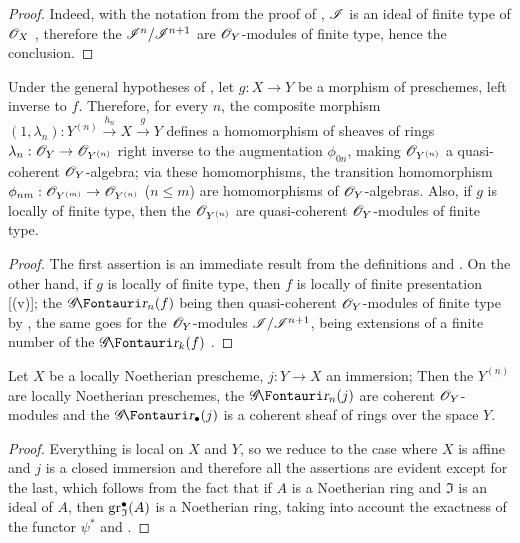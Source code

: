 \begin{proof}
Indeed, with the notation from the proof of , $\mathscr{I}$ is an ideal of finite type of $\mathscr{O}_X$ , therefore the $\mathscr{I}^n/\mathscr{I}^{n+1}$ are $\mathscr{O}_Y$-modules of finite type, hence the conclusion.
\end{proof}

\begin{corollary}[16.1.7]
\label{IV.16.1.7}
Under the general hypotheses of , let $g:X \to Y$ be a morphism of preschemes, left inverse to $f$.
Therefore, for every $n$, the composite morphism $(1, \lambda_n): Y^{(n)}\xrightarrow{h_n} X \xrightarrow{g} Y$ defines a homomorphism of sheaves of rings $\lambda_n: \sh{O}_Y \to \sh{O}_{Y^{(n)}}$ right inverse to the augmentation $\phi_{0n}$, making $\mathscr{O}_{Y^{(n)}}$ a quasi-coherent $\mathscr{O}_Y$-algebra;
via these homomorphisms, the transition homomorphism $\phi_{nm}:\sh{O}_{Y^{(m)}} \to \sh{O}_{Y^{(n)}}$ ($n\leq m$) are homomorphisms of $\mathscr{O}_Y$-algebras. 
Also, if $g$ is locally of finite type, then the $\mathscr{O}_{Y^{(n)}}$ are quasi-coherent $\mathscr{O}_Y$-modules of finite type.
\end{corollary}

\begin{proof}
The first assertion is an immediate result from the definitions and .
On the other hand, if $g$ is locally of finite type, then $f$ is locally of finite presentation [(v)];
the $\shGr_n(f)$ being then quasi-coherent $\mathscr{O}_Y$-modules of finite type by , the same goes for the $\mathscr{O}_Y$-modules $\mathscr{I}/\mathscr{I}^{n+1}$, being extensions of a finite number of the $\shGr_k(f)$ .
\end{proof}

\begin{proposition}[16.1.8]
\label{IV.16.1.8}
Let $X$ be a locally Noetherian prescheme, $j:Y \to X$ an immersion;
Then the $Y^{(n)}$ are locally Noetherian preschemes, the $\shGr_n(j)$ are coherent $\mathscr{O}_Y$-modules and the $\shGr_\bullet(j)$ is a coherent sheaf of rings over the space $Y$.
\end{proposition}

\begin{proof}
Everything is local on $X$ and $Y$, so we reduce to the case where $X$ is affine and $j$ is a closed immersion and therefore all the assertions are evident except for the last, which follows from the fact that if $A$ is a Noetherian ring and $\mathfrak{I}$ is an ideal of $A$, then $\operatorname{gr}_\mathfrak{I}^\bullet(A)$ is a Noetherian ring, taking into account the exactness of the functor $\psi^*$ and .
\end{proof}


